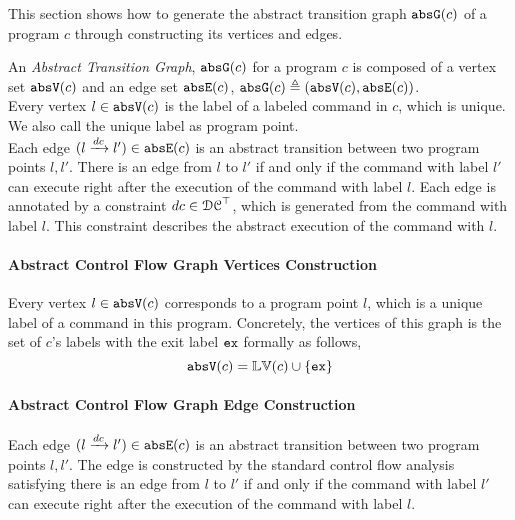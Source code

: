 This section shows how to generate the abstract transition graph $\mathtt{abs}{\mathtt{G}}(c)$ of a
program $c$ through constructing its vertices and edges.

An \emph{Abstract Transition Graph}, $\mathtt{abs}{\mathtt{G}}(c)$ for a program $c$ is composed of
a vertex set $\mathtt{abs}{\mathtt{V}}(c)$ and an edge set $\mathtt{abs}{\mathtt{E}}(c)$, $\mathtt{abs}{\mathtt{G}}(c) \triangleq (\mathtt{abs}{\mathtt{V}}(c), \mathtt{abs}{\mathtt{E}}(c))$.
%
\\
Every 
vertex $l \in \mathtt{abs}{\mathtt{V}}(c)$ is the label of a labeled command in $c$, which is unique.
We also call the unique label as program point.
\\
Each edge $(l \xrightarrow{dc} l') \in \mathtt{abs}{\mathtt{E}}(c)$ is an abstract transition
between two program points $l, l'$. 
There is an edge from $l$ to $l'$ if and only if
the command with label $l'$ can execute right after the execution of the command with label $l$.
Each edge is annotated by a constraint $dc \in \mathcal{DC}^{\top}$, which is generated from the command with label $l$.
This constraint describes the abstract execution of the command with $l$. 

\paragraph{Abstract Control Flow Graph Vertices Construction}
\label{sec:alg_abscfg-vertex}
Every 
vertex $l \in \mathtt{abs}{\mathtt{V}}(c)$ corresponds to a program point $l$, which is a unique
label of a command in this program.
Concretely,
the vertices of this graph is the set of $c$'s labels with the exit label ${\mathtt{ex}}$ formally as follows,
\[ 
  \mathtt{abs}{\mathtt{V}}(c) = \mathbb{LV}(c)\cup\{{\mathtt{ex}}\}
\]

\paragraph{Abstract Control Flow Graph Edge Construction}
\label{sec:alg_abscfg-edge}

Each edge $(l \xrightarrow{dc} l') \in \mathtt{abs}{\mathtt{E}}(c)$ is an abstract transition
between two program points $l, l'$. 
The edge is constructed by the standard control flow analysis satisfying
there is an edge from $l$ to $l'$ if and only if
the command with label $l'$ can execute right after the execution of the command with label $l$.

